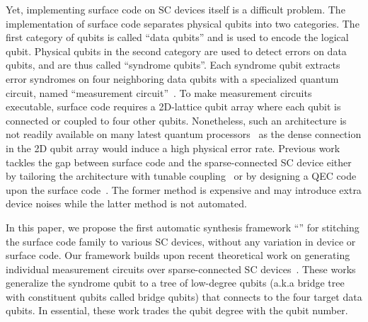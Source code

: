 Yet, implementing surface code on SC devices itself is a difficult problem. %
The implementation of surface code separates physical qubits into two categories. 
The first category of qubits is called ``data qubits'' and is used to encode the logical qubit. 
Physical qubits in the second category are used to detect errors on data qubits, and are thus called ``syndrome qubits''. Each syndrome qubit extracts error syndromes on four neighboring data qubits with a specialized quantum  circuit, named ``measurement circuit''~\cite{fowler2012surface}. 
To make measurement circuits executable, surface code requires a 2D-lattice qubit array where each qubit is connected or coupled to four other qubits. Nonetheless, such an architecture is not readily available on many latest quantum processors~\cite{zhang2020high, gold2021experimental} as the dense connection in the 2D qubit array would induce a high physical error rate. 
Previous work tackles the gap between surface code and the sparse-connected SC device either by tailoring the architecture with tunable coupling~\cite{Google72Q} or by designing a QEC code upon the surface code~\cite{Chamberland2020TopologicalAS}. The former method is expensive and may introduce extra device noises while the latter method is not automated.

In this paper, we propose the first automatic synthesis framework ``\myCompilerName'' for stitching the surface code family to various SC devices, without any variation in device or surface code. Our framework builds upon recent theoretical work on generating individual measurement circuits over sparse-connected SC devices~\cite{Lao2020FaulttolerantQE, Chamberland2020TopologicalAS}. 
These works generalize the syndrome qubit to a tree of low-degree qubits (a.k.a bridge tree with constituent qubits called bridge qubits) that connects to the four target data qubits. In essential, these work trades the qubit degree with the qubit number.

